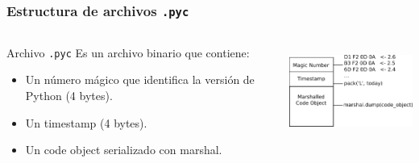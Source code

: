 \documentclass[9pt, notes=hide]{beamer}
\begin{document}
    \begin{frame}
        \frametitle{Estructura de archivos \texttt{.pyc}}

        \begin{columns}[T]
            \begin{column}{.6\textwidth}
                \begin{beamerboxesrounded}[shadow=true]{Archivo \texttt{.pyc}}
                    Es un archivo binario que contiene:
                    \begin{itemize}
                        \item Un número mágico que identifica la versión de Python (4 bytes).
                        \item Un timestamp (4 bytes).
                        \item Un code object serializado con marshal.
                    \end{itemize}
                \end{beamerboxesrounded}
            \end{column}

            \begin{column}{.45\textwidth}
                \includegraphics[height=3cm]{images/pyc.png}
            \end{column}

        \end{columns}

    \end{frame}
\end{document}
